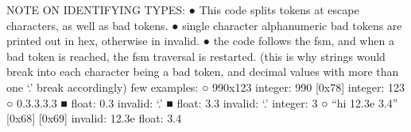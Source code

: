 NOTE ON IDENTIFYING TYPES:
● This code splits tokens at escape characters, as well as bad tokens.
● single character alphanumeric bad tokens are printed out in hex, otherwise in invalid.
● the code follows the fsm, and when a bad token is reached, the fsm traversal is restarted. (this is
why strings would break into each character being a bad token, and decimal values with more
than one ‘.’ break accordingly)
few examples:
○ 990x123
  integer: 990
  [0x78]
  integer: 123 ○ 0.3.3.3.3
■ float: 0.3
  invalid: ‘.’
■ float: 3.3
  invalid: ‘.’
  integer: 3
○ “hi 12.3e 3.4”
  [0x68]
  [0x69]
  invalid: 12.3e
  float: 3.4

